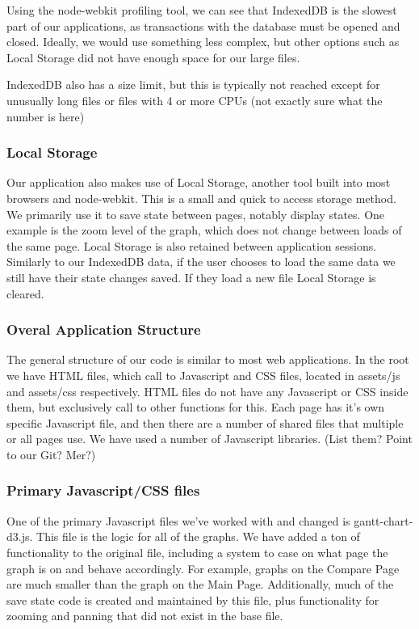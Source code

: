 \documentclass{hmcclinic}
\begin{document}
  Using the node-webkit profiling tool, we can see that IndexedDB is the slowest
  part of our applications, as transactions with the database must be opened and
  closed. Ideally, we would use something less complex, but other options such
  as Local Storage did not have enough space for our large files.

  IndexedDB also has  a size limit, but this is typically not reached except for
  unusually long files or files with 4 or more CPUs (not exactly sure what the
  number is here)

  \subsubsection{Local Storage}

  Our application also makes use of Local Storage, another tool
  built into most browsers and node-webkit. This is a small and quick to access
  storage method. We primarily use it to save state between pages, notably
  display states. One example is the zoom level of the graph, which does not
  change between loads of the same page. Local Storage is also retained between
  application sessions. Similarly to our IndexedDB data, if the user chooses to
  load the same data we still have their state changes saved. If they load a new
  file Local Storage is cleared.

  \subsubsection{Overal Application Structure}

  The general structure of our code is similar to
  most web applications. In the root we have HTML files, which call to
  Javascript and CSS files, located in assets/js and assets/css respectively.
  HTML files do not have any Javascript or CSS inside them, but exclusively call
  to other functions for this. Each page has it's own specific Javascript file,
  and then there are a number of shared files that multiple or all pages use. We
  have used a number of Javascript libraries. (List them? Point to our Git?
  Mer?)

  \subsubsection{Primary Javascript/CSS files}
  One of the primary Javascript files we've worked
  with and changed is gantt-chart-d3.js. This file is the logic for all of the
  graphs. We have added a ton of functionality to the original file, including a
  system to case on what page the graph is on and behave accordingly. For
  example, graphs on the Compare Page are much smaller than the graph on the
  Main Page. Additionally, much of the save state code is created and maintained
  by this file, plus functionality for zooming and panning that did not exist in
  the base file.
\end{document}
